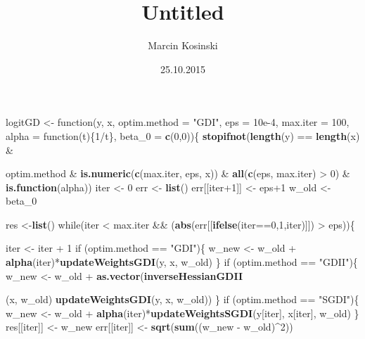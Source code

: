 \documentclass[]{article}
\title{Untitled}
\author{Marcin Kosinski}
\date{25.10.2015}
\newenvironment{Shaded}{\begin{snugshade}}{\end{snugshade}}
\newcommand{\KeywordTok}[1]{\textcolor[rgb]{0.13,0.29,0.53}{\textbf{{#1}}}}
\newcommand{\DataTypeTok}[1]{\textcolor[rgb]{0.13,0.29,0.53}{{#1}}}
\newcommand{\DecValTok}[1]{\textcolor[rgb]{0.00,0.00,0.81}{{#1}}}
\newcommand{\FloatTok}[1]{\textcolor[rgb]{0.00,0.00,0.81}{{#1}}}
\newcommand{\StringTok}[1]{\textcolor[rgb]{0.31,0.60,0.02}{{#1}}}
\newcommand{\NormalTok}[1]{{#1}}
\begin{document}
\maketitle


\begin{Shaded}
\begin{Highlighting}[]
\NormalTok{logitGD <-}\StringTok{ }\NormalTok{function(y, x, }\DataTypeTok{optim.method =} \StringTok{"GDI"}\NormalTok{, }\DataTypeTok{eps =} \FloatTok{10e-4}\NormalTok{,}
                    \DataTypeTok{max.iter =} \DecValTok{100}\NormalTok{, }\DataTypeTok{alpha =} \NormalTok{function(t)\{}\DecValTok{1}\NormalTok{/t\}, }\DataTypeTok{beta_0 =} \KeywordTok{c}\NormalTok{(}\DecValTok{0}\NormalTok{,}\DecValTok{0}\NormalTok{))\{}
  \KeywordTok{stopifnot}\NormalTok{(}\KeywordTok{length}\NormalTok{(y) ==}\StringTok{ }\KeywordTok{length}\NormalTok{(x) &}\StringTok{ }\NormalTok{optim.method %in%}\StringTok{ }\KeywordTok{c}\NormalTok{(}\StringTok{"GDI"}\NormalTok{, }\StringTok{"GDII"}\NormalTok{, }\StringTok{"SGDI"}\NormalTok{)}
            \NormalTok{&}\StringTok{ }\KeywordTok{is.numeric}\NormalTok{(}\KeywordTok{c}\NormalTok{(max.iter, eps, x)) &}\StringTok{ }\KeywordTok{all}\NormalTok{(}\KeywordTok{c}\NormalTok{(eps, max.iter) >}\StringTok{ }\DecValTok{0}\NormalTok{) &}
\StringTok{              }\KeywordTok{is.function}\NormalTok{(alpha))}
  \NormalTok{iter <-}\StringTok{ }\DecValTok{0}
  \NormalTok{err <-}\StringTok{ }\KeywordTok{list}\NormalTok{()}
  \NormalTok{err[[iter}\DecValTok{+1}\NormalTok{]] <-}\StringTok{ }\NormalTok{eps}\DecValTok{+1}
  \NormalTok{w_old <-}\StringTok{ }\NormalTok{beta_0}

  \NormalTok{res <-}\KeywordTok{list}\NormalTok{()}
  \NormalTok{while(iter <}\StringTok{ }\NormalTok{max.iter &&}\StringTok{ }\NormalTok{(}\KeywordTok{abs}\NormalTok{(err[[}\KeywordTok{ifelse}\NormalTok{(iter==}\DecValTok{0}\NormalTok{,}\DecValTok{1}\NormalTok{,iter)]]) >}\StringTok{ }\NormalTok{eps))\{}

    \NormalTok{iter <-}\StringTok{ }\NormalTok{iter +}\StringTok{ }\DecValTok{1}
    \NormalTok{if (optim.method ==}\StringTok{ "GDI"}\NormalTok{)\{}
      \NormalTok{w_new <-}\StringTok{ }\NormalTok{w_old +}\StringTok{ }\KeywordTok{alpha}\NormalTok{(iter)*}\KeywordTok{updateWeightsGDI}\NormalTok{(y, x, w_old)}
    \NormalTok{\}}
    \NormalTok{if (optim.method ==}\StringTok{ "GDII"}\NormalTok{)\{}
      \NormalTok{w_new <-}\StringTok{ }\NormalTok{w_old +}\StringTok{ }\KeywordTok{as.vector}\NormalTok{(}\KeywordTok{inverseHessianGDII}\NormalTok{(x, w_old)%*%}
\StringTok{                                   }\KeywordTok{updateWeightsGDI}\NormalTok{(y, x, w_old))}
    \NormalTok{\}}
    \NormalTok{if (optim.method ==}\StringTok{ "SGDI"}\NormalTok{)\{}
      \NormalTok{w_new <-}\StringTok{ }\NormalTok{w_old +}\StringTok{ }\KeywordTok{alpha}\NormalTok{(iter)*}\KeywordTok{updateWeightsSGDI}\NormalTok{(y[iter], x[iter], w_old)}
    \NormalTok{\}}
    \NormalTok{res[[iter]] <-}\StringTok{ }\NormalTok{w_new}
    \NormalTok{err[[iter]] <-}\StringTok{ }\KeywordTok{sqrt}\NormalTok{(}\KeywordTok{sum}\NormalTok{((w_new -}\StringTok{ }\NormalTok{w_old)^}\DecValTok{2}\NormalTok{))}

}}
\end{Highlighting}
\end{Shaded}
\end{document}
